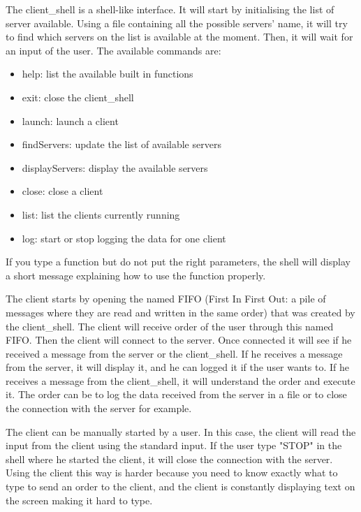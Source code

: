 The client\_shell is a shell-like interface. It will start by initialising the list of server available. Using a file containing all the possible servers’ name, it will try to find which servers on the list is available at the moment. Then, it will wait for an input of the user.
The available commands are:
\begin{itemize}
	\item help: list the available built in functions
	\item exit: close the client\_shell
	\item launch: launch a client
	\item findServers: update the list of available servers
	\item displayServers: display the available servers
	\item close: close a client
	\item list: list the clients currently running 
	\item log: start or stop logging the data for one client
\end{itemize}

If you type a function but do not put the right parameters, the shell will display a short message
explaining how to use the function properly.


The client starts by opening the named FIFO (First In First Out: a pile of messages where they are read and written in the same order) that was created by the client\_shell. The client will receive order of the user through this named FIFO. Then the client will connect to the server. Once connected it will see if he received a message from the server or the client\_shell.
If he receives a message from the server, it will display it, and he can logged it if the user wants to.
If he receives a message from the client\_shell, it will understand the order and execute it. The order can be to log the data received from the server in a file or to close the connection with the server for example.

The client can be manually started by a user. In this case, the client will read the input from the client using the standard input. If the user type "STOP" in the shell where he started the client, it will close the connection with the server. Using the client this way is harder because you need to know exactly what to type to send an order to the client, and the client is constantly displaying text on the screen making it hard to type.


